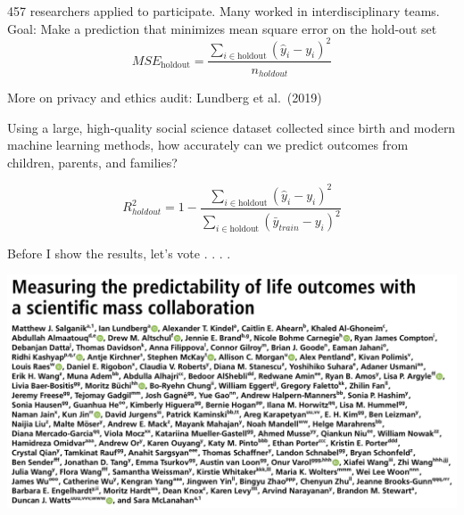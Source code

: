 \documentclass[aspectratio=169]{beamer}
\begin{document}
\begin{frame}

457 researchers applied to participate. Many worked in interdisciplinary teams. Goal: Make a prediction that minimizes mean square error on the hold-out set
\begin{equation*}
MSE_{\text{holdout}} = \frac{\sum_{i \in \text{holdout}} (\hat{y}_i - y_i)^2}{n_{holdout}}
\end{equation*}

\vfill
More on privacy and ethics audit: Lundberg et al.\ (2019)
\end{frame}
\begin{frame}

Using a large, high-quality social science dataset collected since birth and modern machine learning methods, how accurately can we predict outcomes from children, parents, and families?

\begin{equation*}
R^2_{holdout} = 1 - \frac{\sum_{i \in \text{holdout}} (\hat{y}_i - y_i)^2}{\sum_{i \in \text{holdout}} (\bar{y}_{train} - y_i)^2}
\end{equation*}

\pause 
\vfill

Before I show the results, let's vote . . . .

\end{frame}
\begin{frame}

\begin{center}
\includegraphics[width=\textwidth]{figures/salganik_measuring_2020_title_authors}
\end{center}

\end{frame}

\frame{\titlepage}
\end{document}
